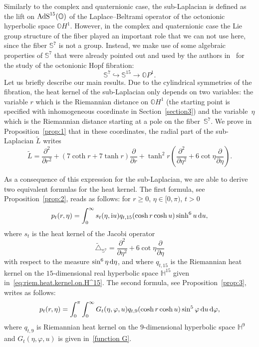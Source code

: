 \documentclass[10pt,a4paper]{amsart}
\numberwithin{equation}{section}
\begin{document}
Similarly to the complex and quaternionic case, the sub-Laplacian is defined as the lift on ${\rm AdS}^{15}(\mathbb{O})$ of the Laplace--Beltrami operator of the octonionic hyperbolic space $\mathbb{O}H^1$. However, in the complex and quaternionic case the Lie group structure of the fiber played an important role that we can not use here, since the fiber $\mathbb{S}^7$ is not a group. Instead, we make use of some algebraic properties of $\mathbb S^7$ that were already pointed out and used by the authors in~\cite{FBGC19} for the study of the octonionic Hopf fibration:
\begin{equation*}
\mathbb{S}^7 \hookrightarrow \mathbb{S}^{15} \rightarrow \mathbb{O}P^1.
\end{equation*}
Let us briefly describe our main results. Due to the cylindrical symmetries of the fibration, the heat kernel of the sub-Laplacian only depends on two variables: the variable $r$ which is the Riemannian distance on $\mathbb{O}H^1$ (the starting point is specified with inhomogeneous coordinate in Section~\ref{section3}) and the variable~$\eta$ which is the Riemannian distance starting at a pole on the fiber~$\mathbb{S}^7$. We prove in Proposition~\ref{prop:1} that in these coordinates, the radial part of the sub-Laplacian $\tilde{L}$ writes
\begin{equation*}
\tilde{L}=\frac{{\partial}^2}{\partial {r}^2}+(7\coth r+7\tanh r)\frac{{\partial}}{\partial {r}}+{\tanh^2 r}\left(\frac{{\partial}^2}{\partial {\eta}^2}+6\cot \eta\frac{{\partial}}{\partial {\eta}}\right).
\end{equation*}

As a consequence of this expression for the sub-Laplacian, we are able to derive two equivalent formulas for the heat kernel. The first formula, see Proposition~\ref{prop:2}, reads as follows: for $r\geq 0$, $\eta\in [0,\pi)$, $t>0$
\begin{align*}
p_t(r,\eta)=\int_{0}^{\infty} s_t(\eta , {\rm i}u) q_{t,15}(\cosh r \cosh u) \sinh^6u \, {\rm d}u,
\end{align*}
where $s_t$ is the heat kernel of the Jacobi operator
\begin{equation*}
\tilde{\triangle}_{\mathbb{S}^7}=\frac{{\partial}^2}{\partial {\eta}^2}+6\cot \eta\frac{{\partial}}{\partial {\eta}}
\end{equation*}
with respect to the measure $\sin^6\eta \, {\rm d}\eta$, and where $q_{t,15}$ is the Riemannian heat kernel on the $15$-dimensional real hyperbolic space $\mathbb{H}^{15}$ given in~\eqref{eq:riem.heat.kernel.on.H^15}.
The second formula, see Proposition~\ref{prop:3}, writes as follows:
\begin{gather*}
p_t(r,\eta)= \int_0^\pi \int_{0}^{\infty} G_t(\eta, \varphi, u) q_{t,9}(\cosh r \cosh u) \sin^5 \varphi \, {\rm d}u \, {\rm d} \varphi ,
\end{gather*}
where $q_{t,9}$ is Riemannian heat kernel on the $9$-dimensional hyperbolic space $\mathbb{H}^{9}$ and $G_t(\eta, \varphi, u)$ is given in~\eqref{function G}.
\end{document}
